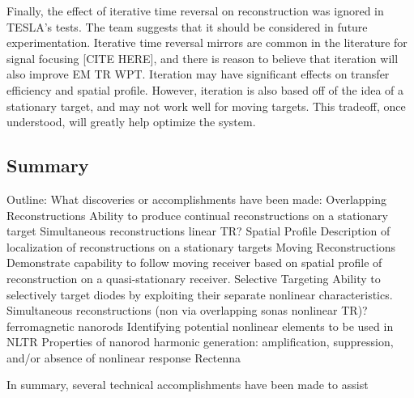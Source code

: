 Finally, the effect of iterative time reversal on reconstruction was ignored in TESLA's tests.  The team suggests that it should be considered in future experimentation. Iterative time reversal mirrors are common in the literature for signal focusing [CITE HERE], and there is reason to believe that iteration will also improve EM TR WPT.  Iteration may have significant effects on transfer efficiency and spatial profile.  However, iteration is also based off of the idea of a stationary target, and may not work well for moving targets.  This tradeoff, once understood, will greatly help optimize the system.

\subsection{Summary}

Outline:
	What discoveries or accomplishments have been made:
Overlapping Reconstructions
Ability to produce continual reconstructions on a stationary target
Simultaneous reconstructions {linear TR}?
Spatial Profile
Description of localization of reconstructions on a stationary targets
Moving Reconstructions
Demonstrate capability to follow moving receiver based on spatial profile of reconstruction on a quasi-stationary receiver.
Selective Targeting
Ability to selectively target diodes by exploiting their separate nonlinear characteristics.
Simultaneous reconstructions (non via overlapping sonas {nonlinear TR})?
ferromagnetic nanorods
Identifying potential nonlinear elements to be used in NLTR
Properties of nanorod harmonic generation: amplification, suppression, and/or absence of nonlinear response
Rectenna

In summary, several technical accomplishments have been made to assist
